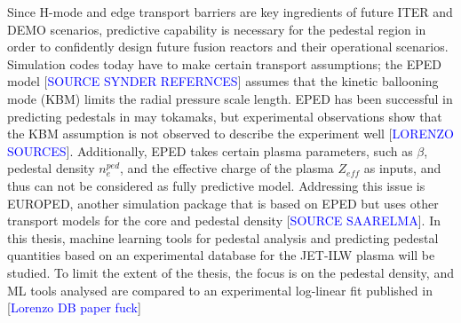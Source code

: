 \documentclass[a4paper, twoside, final, 12pt]{article}
\begin{document}
Since H-mode and edge transport barriers are key ingredients of future ITER and DEMO scenarios, predictive capability is necessary for the pedestal region in order to confidently design future fusion reactors and their operational scenarios.
Simulation codes today have to make certain transport assumptions; the EPED model [\textcolor{blue}{SOURCE SYNDER REFERNCES}] assumes that the kinetic ballooning mode (KBM) limits the radial pressure scale length.
EPED has been successful in predicting pedestals in may tokamaks, but experimental observations show that the KBM assumption is not observed to describe the experiment well [\textcolor{blue}{LORENZO SOURCES}].
Additionally, EPED takes certain plasma parameters, such as $\beta$, pedestal density $n_e^{ped}$, and the effective charge of the plasma $Z_{eff}$ as inputs, and thus can not be considered as fully predictive model.
Addressing this issue is EUROPED, another simulation package that is based on EPED but uses other transport models for the core and pedestal density [\textcolor{blue}{SOURCE SAARELMA}].
In this thesis, machine learning tools for pedestal analysis and predicting pedestal quantities based on an experimental database for the JET-ILW plasma will be studied.
To limit the extent of the thesis, the focus is on the pedestal density, and ML tools analysed are compared to an experimental log-linear fit published in [\textcolor{blue}{Lorenzo DB paper fuck}]
\end{document}
